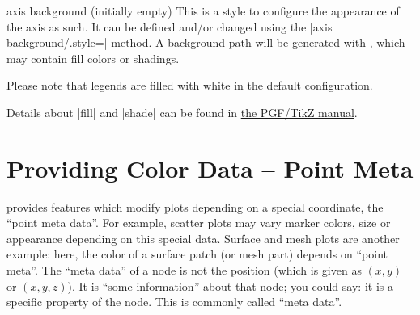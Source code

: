 \begin{pgfplotskey}{axis background (initially empty)}
    This is a style to configure the appearance of the axis as such. It can be
    defined and/or changed using the |axis background/.style=|
    method. A background path will be generated with , which may
    contain fill colors or shadings.
\pgfplotsexpensiveexample
\begin{codeexample}[]
\end{codeexample}

    Please note that legends are filled with white in the default
    configuration.
\begin{codeexample}[]
\end{codeexample}
    Details about |fill| and |shade| can be found in \href{https://tikz.dev/}{the PGF/TikZ manual}.
\end{pgfplotskey}


\section[reference.meta]{Providing Color Data -- Point Meta}
\label{sec:pgfplots:point:meta}

\PGFPlots{} provides features which modify plots depending on a special
coordinate, the ``point meta data''. For example, scatter plots may vary marker
colors, size or appearance depending on this special data. Surface and mesh
plots are another example: here, the color of a surface patch (or mesh part)
depends on ``point meta''. The ``meta data'' of a node is not the position
(which is given as $(x,y)$ or $(x,y,z)$). It is ``some information'' about that
node; you could say: it is a specific property of the node. This is commonly
called ``meta data''.


